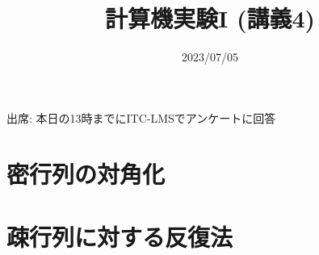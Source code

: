 \documentclass[10pt,dvipdfmx]{beamer}
\title{計算機実験I (講義4)}
\date{2023/07/05}
\begin{document}
\begin{frame}
  \titlepage
  \tableofcontents
  出席: 本日の13時までにITC-LMSでアンケートに回答
\end{frame}

\section{密行列の対角化}


%

%











%


\section{疎行列に対する反復法}

%











% 
% 





\section{}

\end{document}
